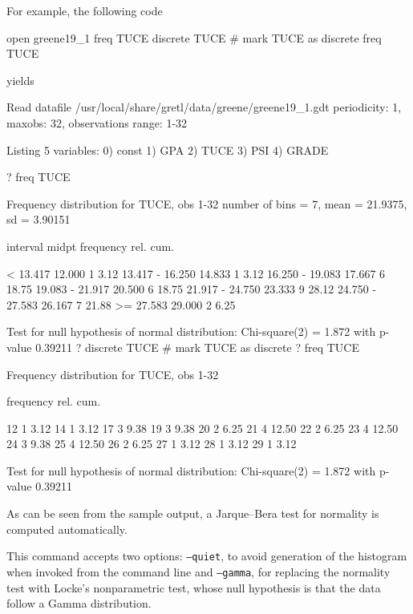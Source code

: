 For example, the following code
\begin{code}
  open greene19_1
  freq TUCE
  discrete TUCE # mark TUCE as discrete
  freq TUCE
\end{code}
yields
\begin{code}
Read datafile /usr/local/share/gretl/data/greene/greene19_1.gdt
periodicity: 1, maxobs: 32,
observations range: 1-32

Listing 5 variables:
  0) const    1) GPA      2) TUCE     3) PSI      4) GRADE  

? freq TUCE

Frequency distribution for TUCE, obs 1-32
number of bins = 7, mean = 21.9375, sd = 3.90151

       interval          midpt   frequency    rel.     cum.

          <  13.417     12.000        1      3.12%
    13.417 - 16.250     14.833        1      3.12%
    16.250 - 19.083     17.667        6     18.75%
    19.083 - 21.917     20.500        6     18.75%
    21.917 - 24.750     23.333        9     28.12%
    24.750 - 27.583     26.167        7     21.88%
          >= 27.583     29.000        2      6.25%

Test for null hypothesis of normal distribution:
Chi-square(2) = 1.872 with p-value 0.39211
? discrete TUCE # mark TUCE as discrete
? freq TUCE

Frequency distribution for TUCE, obs 1-32

          frequency    rel.     cum.

  12           1      3.12%
  14           1      3.12%
  17           3      9.38%
  19           3      9.38%
  20           2      6.25%
  21           4     12.50%
  22           2      6.25%
  23           4     12.50%
  24           3      9.38%
  25           4     12.50%
  26           2      6.25%
  27           1      3.12%
  28           1      3.12%
  29           1      3.12%

Test for null hypothesis of normal distribution:
Chi-square(2) = 1.872 with p-value 0.39211
\end{code}
As can be seen from the sample output, a Jarque--Bera test for
normality is computed automatically.

This command accepts two options: \texttt{--quiet}, to avoid
generation of the histogram when invoked from the command line and
\texttt{--gamma}, for replacing the normality test with Locke's
nonparametric test, whose null hypothesis is that the data follow a
Gamma distribution.

